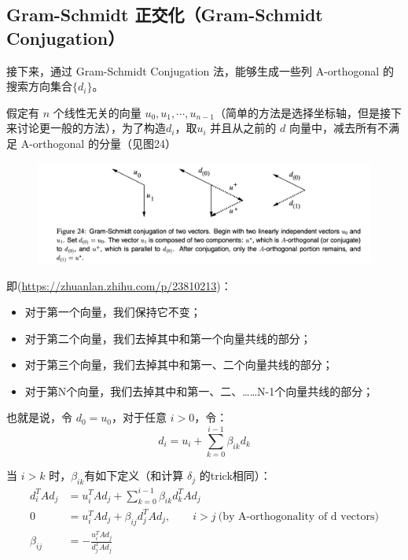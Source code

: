 \documentclass[12pt]{article}
\begin{document}
\subsection{Gram-Schmidt 正交化（Gram-Schmidt Conjugation）}
接下来，通过 Gram-Schmidt Conjugation 法，能够生成一些列 A-orthogonal 的搜索方向集合$\{d_i\}$。

假定有 $n$ 个线性无关的向量 $u_0, u_1, \cdots, u_{n-1}$（简单的方法是选择坐标轴，但是接下来讨论更一般的方法），为了构造$d_i$，取$u_i$ 并且从之前的 $d$ 向量中，减去所有不满足 A-orthogonal 的分量（见图24）
\begin{figure}[H]
    \centering
    \includegraphics[width=1\textwidth]{fig/CG_Gram_Schmidt_Example.png}
\end{figure}

即(\url{https://zhuanlan.zhihu.com/p/23810213})：
\begin{itemize}
\setlength{\itemsep}{0pt}
\setlength{\parsep}{0pt}
\setlength{\parskip}{0pt}
    \item 对于第一个向量，我们保持它不变；
    \item 对于第二个向量，我们去掉其中和第一个向量共线的部分；
    \item 对于第三个向量，我们去掉其中和第一、二个向量共线的部分；
    \item 对于第N个向量，我们去掉其中和第一、二、……N-1个向量共线的部分；
\end{itemize}

也就是说，令 $d_0 = u_0$，对于任意 $i > 0$，令：
$$
d_i = u_i + \sum_{k=0}^{i-1}\beta_{ik}d_k
$$

当 $i > k$ 时，$\beta_{ik}$有如下定义（和计算 $\delta_j$ 的trick相同）：
\begin{align*}
d^T_iAd_j &= u^T_iAd_j + \sum_{k=0}^{i-1}\beta_{ik}d^T_kAd_j \\
0 &= u^T_iAd_j + \beta_{ij}d^T_jAd_j,  \qquad i > j \ \text{(by A-orthogonality of d vectors)} \\
\beta_{ij} &= -\frac{u^T_iAd_j}{d^T_jAd_j}
\end{align*}
\end{document}
